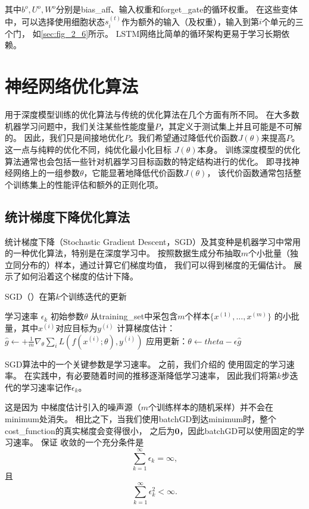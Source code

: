 其中$b^o, U^o, W^o$分别是\gls{bias_aff}、输入权重和\gls{forget_gate}的循环权重。
在这些变体中，可以选择使用细胞状态$s_i^{(t)}$作为额外的输入（及权重），输入到第$i$个单元的三个门，
如\ref{sec:fig_2_6}所示。
LSTM网络比简单的循环架构更易于学习长期依赖。

\section{神经网络优化算法}
用于深度模型训练的优化算法与传统的优化算法在几个方面有所不同。 
在大多数机器学习问题中，我们关注某些性能度量$P$，其定义于测试集上并且可能是不可解的。
因此，我们只是间接地优化$P$。我们希望通过降低代价函数$J(\theta)$来提高$P$。
这一点与纯粹的优化不同，纯优化最小化目标 $J(\theta)$本身。
训练深度模型的优化算法通常也会包括一些针对机器学习目标函数的特定结构进行的优化。
即寻找神经网络上的一组参数$\theta$，它能显著地降低代价函数$J(\theta)$，
该代价函数通常包括整个训练集上的性能评估和额外的正则化项。

\subsection{统计梯度下降优化算法}
\label{sec_chap8}
统计梯度下降（Stochastic Gradient Descent，SGD）及其变种是机器学习中常用的一种优化算法，特别是在深度学习中。
按照数据生成分布抽取$m$个小批量（独立同分布的）样本，通过计算它们梯度均值，
我们可以得到梯度的无偏估计。
展示了如何沿着这个梯度的估计下降。

\begin{algorithm}[ht]
	\caption{\gls{SGD}（）在第$k$个训练迭代的更新}
	\label{alg:sgd}
	\begin{algorithmic}
		\REQUIRE 学习速率 $\epsilon_k$
		\REQUIRE 初始参数$\theta$
		\STATE 从\gls{training_set}中采包含$m$个样本$\{ x^{(1)},\dots, x^{(m)}\}$ 的小批量，其中$x^{(i)}$对应目标为$y^{(i)}$
		\STATE 计算梯度估计： $\hat{g} \leftarrow + 
		\frac{1}{m} \nabla_{\theta} \sum_i L(f(x^{(i)};\theta),y^{(i)})$
		\STATE 应用更新：$\theta \leftarrow theta - \epsilon \hat{g}$
		\ENDWHILE
	\end{algorithmic}
\end{algorithm}

SGD算法中的一个关键参数是学习速率。
之前，我们介绍的\,\,使用固定的学习速率。
在实践中，有必要随着时间的推移逐渐降低学习速率，
因此我们将第$k$步迭代的学习速率记作$\epsilon_k$。

这是因为\,\,中梯度估计引入的噪声源（$m$个训练样本的随机采样）并不会在\gls{minimum}处消失。
相比之下，当我们使用\gls{batch}\gls{GD}到达\gls{minimum}时，整个\gls{cost_function}的真实梯度会变得很小，
之后为$\mathbf{0}$，因此\gls{batch}\gls{GD}可以使用固定的学习速率。
保证\,\,收敛的一个充分条件是
\begin{equation}
\label{eq:8.12}
\sum_{k=1}^\infty \epsilon_k = \infty,
\end{equation}
且
\begin{equation}
\label{eq:8.13}
\sum_{k=1}^\infty \epsilon_k^2 < \infty.
\end{equation}


